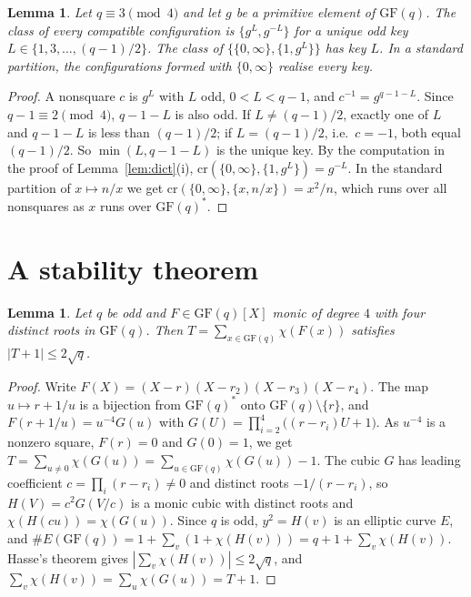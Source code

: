 \documentclass[11pt,a4paper]{article}
\newtheorem{lemma}[theorem]{Lemma}
\theoremstyle{definition}
\theoremstyle{remark}
\newcommand{\GF}{\mathrm{GF}}
\newcommand{\cro}{\mathrm{cr}}
\begin{document}
\begin{lemma}\label{lem:classes}
Let $q\equiv3\pmod4$ and let $g$ be a primitive element of $\GF(q)$. The class of every compatible
configuration is $\{g^L,g^{-L}\}$ for a unique odd \emph{key} $L\in\{1,3,\dots,(q-1)/2\}$. The class of $\{\{0,\infty\},\{1,g^L\}\}$ has key $L$.
In a standard partition, the configurations formed with $\{0,\infty\}$ realise every key.
\end{lemma}

\begin{proof}
A nonsquare $c$ is $g^{L}$ with $L$ odd, $0<L<q-1$, and $c^{-1}=g^{q-1-L}$. Since $q-1\equiv2\pmod4$,
$q-1-L$ is also odd. If $L\ne(q-1)/2$, exactly one of $L$ and $q-1-L$ is less than $(q-1)/2$; if $L=(q-1)/2$, i.e.\
$c=-1$, both equal $(q-1)/2$. So $\min(L,q-1-L)$ is the unique key. By the computation in the proof of Lemma~\ref{lem:dict}(i), $\cro(\{0,\infty\},\{1,g^L\})=g^{-L}$. In the standard
partition of $x\mapsto n/x$ we get $\cro(\{0,\infty\},\{x,n/x\})=x^2/n$, which runs over all nonsquares as
$x$ runs over $\GF(q)^*$.
\end{proof}

\section{A stability theorem}

\begin{lemma}\label{lem:hasse}
Let $q$ be odd and $F\in\GF(q)[X]$ monic of degree $4$ with four distinct roots in $\GF(q)$. Then
$T=\sum_{x\in\GF(q)}\chi(F(x))$ satisfies $|T+1|\le2\sqrt q$.
\end{lemma}

\begin{proof}
Write $F(X)=(X-r)(X-r_2)(X-r_3)(X-r_4)$. The map $u\mapsto r+1/u$ is a bijection from $\GF(q)^*$ onto
$\GF(q)\setminus\{r\}$, and $F(r+1/u)=u^{-4}G(u)$ with $G(U)=\prod_{i=2}^4\bigl((r-r_i)U+1\bigr)$. As $u^{-4}$ is a
nonzero square, $F(r)=0$ and $G(0)=1$, we get $T=\sum_{u\ne0}\chi(G(u))=\sum_{u\in\GF(q)}\chi(G(u))-1$. The cubic $G$ has
leading coefficient $c=\prod_i(r-r_i)\ne0$ and distinct roots $-1/(r-r_i)$, so $H(V)=c^2G(V/c)$ is a monic cubic with
distinct roots and $\chi(H(cu))=\chi(G(u))$. Since $q$ is odd, $y^2=H(v)$ is an elliptic curve $E$, and
$\#E(\GF(q))=1+\sum_v(1+\chi(H(v)))=q+1+\sum_v\chi(H(v))$. Hasse's theorem \cite[Theorem~V.1.1]{Silverman}
gives $|\sum_v\chi(H(v))|\le2\sqrt q$, and $\sum_v\chi(H(v))=\sum_u\chi(G(u))=T+1$.
\end{proof}
\end{document}
